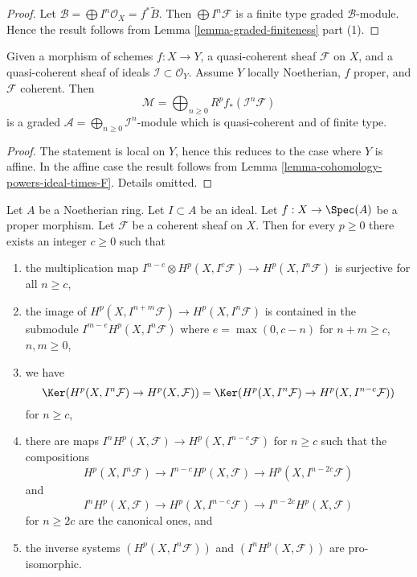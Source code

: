 \begin{proof}
Let $\mathcal{B} = \bigoplus I^n\mathcal{O}_X = f^*\widetilde{B}$.
Then $\bigoplus I^n\mathcal{F}$ is a finite type
graded $\mathcal{B}$-module. Hence the result follows
from Lemma \ref{lemma-graded-finiteness} part (1).
\end{proof}

\begin{lemma}
\label{lemma-cohomology-powers-ideal-times-sheaf}
Given a morphism of schemes $f : X \to Y$, a quasi-coherent sheaf
$\mathcal{F}$ on $X$, and a quasi-coherent sheaf of ideals
$\mathcal{I} \subset \mathcal{O}_Y$. Assume $Y$ locally
Noetherian, $f$ proper, and $\mathcal{F}$ coherent.
Then
$$
\mathcal{M} =
\bigoplus\nolimits_{n \geq 0} R^pf_*(\mathcal{I}^n\mathcal{F})
$$
is a graded $\mathcal{A} = \bigoplus_{n \geq 0} \mathcal{I}^n$-module
which is quasi-coherent and of finite type.
\end{lemma}

\begin{proof}
The statement is local on $Y$, hence this reduces to the
case where $Y$ is affine. In the affine case the result follows
from Lemma \ref{lemma-cohomology-powers-ideal-times-F}.
Details omitted.
\end{proof}

\begin{lemma}
\label{lemma-cohomology-powers-ideal-application}
Let $A$ be a Noetherian ring.
Let $I \subset A$ be an ideal.
Let $f : X \to \Spec(A)$ be a proper morphism.
Let $\mathcal{F}$ be a coherent sheaf on $X$.
Then for every $p \geq 0$ there exists an integer $c \geq 0$
such that
\begin{enumerate}
\item the multiplication map
$I^{n - c} \otimes H^p(X, I^c\mathcal{F}) \to H^p(X, I^n\mathcal{F})$
is surjective for all $n \geq c$,
\item the image of $H^p(X, I^{n + m}\mathcal{F}) \to H^p(X, I^n\mathcal{F})$
is contained in the submodule $I^{m - e} H^p(X, I^n\mathcal{F})$
where $e = \max(0, c - n)$ for $n + m \geq c$, $n, m \geq 0$,
\item we have
$$
\Ker(H^p(X, I^n\mathcal{F}) \to H^p(X, \mathcal{F})) =
\Ker(H^p(X, I^n\mathcal{F}) \to H^p(X, I^{n - c}\mathcal{F}))
$$
for $n \geq c$,
\item there are maps $I^nH^p(X, \mathcal{F}) \to H^p(X, I^{n - c}\mathcal{F})$
for $n \geq c$ such that the compositions
$$
H^p(X, I^n\mathcal{F}) \to 
I^{n - c}H^p(X, \mathcal{F}) \to
H^p(X, I^{n - 2c}\mathcal{F})
$$
and
$$
I^nH^p(X, \mathcal{F}) \to
H^p(X, I^{n - c}\mathcal{F}) \to
I^{n - 2c}H^p(X, \mathcal{F})
$$
for $n \geq 2c$ are the canonical ones, and
\item the inverse systems $(H^p(X, I^n\mathcal{F}))$ and
$(I^nH^p(X, \mathcal{F}))$ are pro-isomorphic.
\end{enumerate}
\end{lemma}

